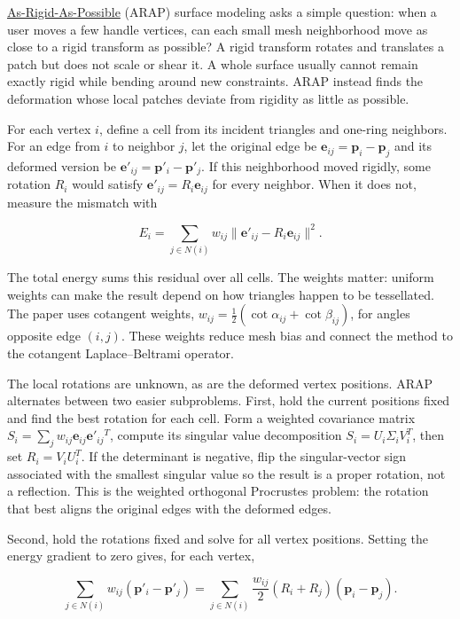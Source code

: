 \hyperref[appendix-7107009c505b]{As-Rigid-As-Possible} (ARAP) surface modeling asks a simple question: when a user moves a few handle vertices, can each small mesh neighborhood move as close to a rigid transform as possible? A rigid transform rotates and translates a patch but does not scale or shear it. A whole surface usually cannot remain exactly rigid while bending around new constraints. ARAP instead finds the deformation whose local patches deviate from rigidity as little as possible.

For each vertex \(i\), define a cell from its incident triangles and one-ring neighbors. For an edge from \(i\) to neighbor \(j\), let the original edge be \(\mathbf{e}_{ij}=\mathbf{p}_i-\mathbf{p}_j\) and its deformed version be \(\mathbf{e}'_{ij}=\mathbf{p}'_i-\mathbf{p}'_j\). If this neighborhood moved rigidly, some rotation \(R_i\) would satisfy \(\mathbf{e}'_{ij}=R_i\mathbf{e}_{ij}\) for every neighbor. When it does not, measure the mismatch with

\[E_i=\sum_{j\in N(i)}w_{ij}\|\mathbf{e}'_{ij}-R_i\mathbf{e}_{ij}\|^2.\]

The total energy sums this residual over all cells. The weights matter: uniform weights can make the result depend on how triangles happen to be tessellated. The paper uses cotangent weights, \(w_{ij}=\tfrac12(\cot\alpha_{ij}+\cot\beta_{ij})\), for angles opposite edge \((i,j)\). These weights reduce mesh bias and connect the method to the cotangent Laplace--Beltrami operator.

The local rotations are unknown, as are the deformed vertex positions. ARAP alternates between two easier subproblems. First, hold the current positions fixed and find the best rotation for each cell. Form a weighted covariance matrix \(S_i=\sum_jw_{ij}\mathbf{e}_{ij}\mathbf{e}'_{ij}{}^T\), compute its singular value decomposition \(S_i=U_i\Sigma_iV_i^T\), then set \(R_i=V_iU_i^T\). If the determinant is negative, flip the singular-vector sign associated with the smallest singular value so the result is a proper rotation, not a reflection. This is the weighted orthogonal Procrustes problem: the rotation that best aligns the original edges with the deformed edges.

Second, hold the rotations fixed and solve for all vertex positions. Setting the energy gradient to zero gives, for each vertex,

\[\sum_{j\in N(i)}w_{ij}(\mathbf{p}'_i-\mathbf{p}'_j)=\sum_{j\in N(i)}\frac{w_{ij}}{2}(R_i+R_j)(\mathbf{p}_i-\mathbf{p}_j).\]

